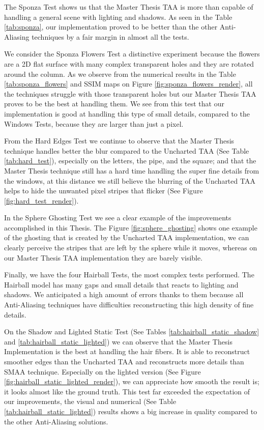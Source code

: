 \documentclass{cslthse-msc}
\begin{document}
The Sponza Test shows us that the Master Thesis TAA is more than capable of handling a general scene with lighting and shadows. As seen in the Table \ref{tab:sponza}, our implementation proved to be better than the other Anti-Aliasing techniques by a fair margin in almost all the tests.

We consider the Sponza Flowers Test a distinctive experiment because the flowers are a 2D flat surface with many complex transparent holes and they are rotated around the column. As we observe from the numerical results in the Table \ref{tab:sponza_flowers} and SSIM maps on Figure \ref{fig:sponza_flowers_render}, all the techniques struggle with those transparent holes but our Master Thesis TAA proves to be the best at handling them.  We see from this test that our implementation is good at handling this type of small details, compared to the Windows Tests, because they are larger than just a pixel. 

From the Hard Edges Test we continue to observe that the Master Thesis technique handles better the blur compared to the Uncharted TAA (See Table \ref{tab:hard_test}), especially on the letters, the pipe, and the square; and that the Master Thesis technique still has a hard time handling the super fine details from the windows, at this distance we still believe the blurring of the Uncharted TAA helps to hide the unwanted pixel stripes that flicker (See Figure \ref{fig:hard_test_render}).

In the Sphere Ghosting Test we see a clear example of the improvements accomplished in this Thesis. The Figure \ref{fig:sphere_ghosting} shows one example of the ghosting that is created by the Uncharted TAA implementation, we can clearly perceive the stripes that are left by the sphere while it moves, whereas on our Master Thesis TAA implementation they are barely visible.

Finally, we have the four Hairball Tests, the most complex tests performed. The Hairball model has many gaps and small details that reacts to lighting and shadows. We anticipated a high amount of errors thanks to them because all Anti-Aliasing techniques have difficulties reconstructing this high density of fine details. 

On the Shadow and Lighted Static Test (See Tables \ref{tab:hairball_static_shadow} and \ref{tab:hairball_static_lighted}) we can observe that the Master Thesis Implementation is the best at handling the hair fibers. It is able to reconstruct smoother edges than the Uncharted TAA and reconstructs more details than SMAA technique. Especially on the lighted version (See Figure \ref{fig:hairball_static_lighted_render}), we can appreciate how smooth the result is; it looks almost like the ground truth. This test far exceeded the expectation of our improvements, the visual and numerical (See Table \ref{tab:hairball_static_lighted}) results shows a big increase in quality compared to the other Anti-Aliasing solutions.
\end{document}
